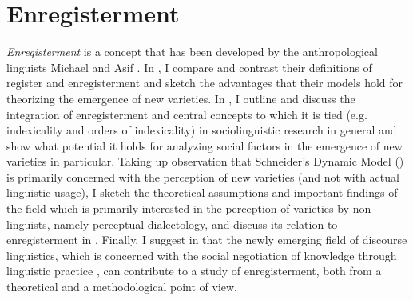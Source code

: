 \section{Enregisterment}
\label{bkm:Ref522870698}\hypertarget{Toc63021210}{}\label{bkm:Ref522888605}
\textit{Enregisterment} is a concept that has been developed by the anthropological linguists Michael \citet{Silverstein2003, Silverstein1979, Silverstein1993} and Asif \citet{Agha2003, Agha2007}. In , I compare and contrast their definitions of register and enregisterment and sketch the advantages that their models hold for theorizing the emergence of new varieties. In , I outline and discuss the integration of enregisterment and central concepts to which it is tied (e.g. indexicality and orders of indexicality) in sociolinguistic research in general and show what potential it holds for analyzing social factors in the emergence of new varieties in particular. Taking up  observation that Schneider’s Dynamic Model (\citeyear{Schneider2007}) is primarily concerned with the perception of new varieties (and not with actual linguistic usage), I sketch the theoretical assumptions and important findings of the field which is primarily interested in the perception of varieties by non-linguists, namely perceptual dialectology, and discuss its relation to enregisterment in . Finally, I suggest in  that the newly emerging field of discourse linguistics, which is concerned with the social negotiation of knowledge through linguistic practice \citep[53]{Spitzmuller2011}, can contribute to a study of enregisterment, both from a theoretical and a methodological point of view.


